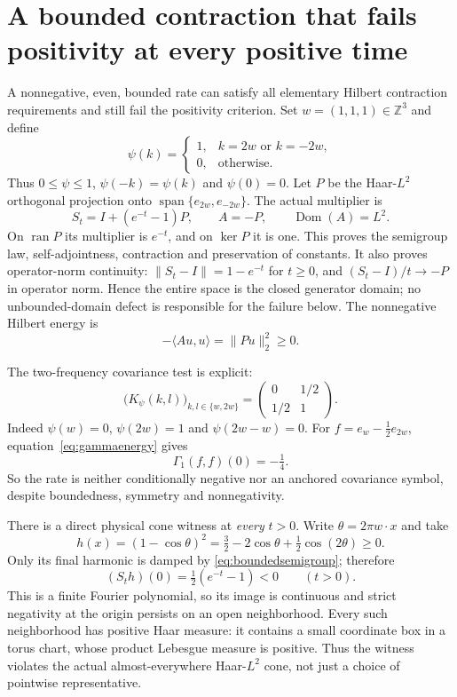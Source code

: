 \documentclass[11pt]{article}
\theoremstyle{remark}\newtheorem{remark}[theorem]{Remark}
\newcommand{\Z}{\mathbb Z}\newcommand{\T}{\mathbb T}
\DeclareMathOperator{\Dom}{Dom}
\begin{document}
\section{A bounded contraction that fails positivity at every positive time}\label{sec:bounded-rate}
A nonnegative, even, bounded rate can satisfy all elementary Hilbert
contraction requirements and still fail the positivity criterion.
Set $w=(1,1,1)\in\Z^3$ and define
\[
 \psi(k)=\begin{cases}1,&k=2w\text{ or }k=-2w,\\0,&\text{otherwise}.
 \end{cases}
\]
Thus $0\leq\psi\leq1$, $\psi(-k)=\psi(k)$ and $\psi(0)=0$.
Let $P$ be the Haar-$L^2$ orthogonal projection onto
$\operatorname{span}\{e_{2w},e_{-2w}\}$. The actual multiplier is
\begin{equation}\label{eq:boundedsemigroup}
 S_t=I+(e^{-t}-1)P,\qquad A=-P,\qquad\Dom(A)=L^2.
\end{equation}
On $\operatorname{ran}P$ its multiplier is $e^{-t}$, and on
$\ker P$ it is one. This proves the semigroup law, self-adjointness,
contraction and preservation of constants. It also proves operator-norm
continuity: $\|S_t-I\|=1-e^{-t}$ for $t\geq0$, and
$(S_t-I)/t\to-P$ in operator norm. Hence the entire space is the
closed generator domain; no unbounded-domain defect is responsible
for the failure below. The nonnegative Hilbert energy is
\[
 -\langle Au,u\rangle=\|Pu\|_2^2\geq0.
\]

The two-frequency covariance test is explicit:
\[
 \bigl(K_\psi(k,l)\bigr)_{k,l\in\{w,2w\}}
 =\begin{pmatrix}0&1/2\\1/2&1\end{pmatrix}.
\]
Indeed $\psi(w)=0$, $\psi(2w)=1$ and $\psi(2w-w)=0$.
For $f=e_w-\tfrac12e_{2w}$, equation~\eqref{eq:gammaenergy} gives
\begin{equation}\label{eq:boundedgamma}
 \Gamma_1(f,f)(0)=-\tfrac14.
\end{equation}
So the rate is neither conditionally negative nor an anchored
covariance symbol, despite boundedness, symmetry and nonnegativity.

There is a direct physical cone witness at \emph{every} $t>0$.
Write $\theta=2\pi w\cdot x$ and take
\[
 h(x)=(1-\cos\theta)^2
 =\tfrac32-2\cos\theta+\tfrac12\cos(2\theta)\geq0.
\]
Only its final harmonic is damped by \eqref{eq:boundedsemigroup};
therefore
\[
 (S_th)(0)=\tfrac12(e^{-t}-1)<0\qquad(t>0).
\]
This is a finite Fourier polynomial, so its image is continuous and
strict negativity at the origin persists on an open neighborhood.
Every such neighborhood has positive Haar measure: it contains a
small coordinate box in a torus chart, whose product Lebesgue measure
is positive. Thus the witness violates the actual almost-everywhere
Haar-$L^2$ cone, not just a choice of pointwise representative.
\end{document}
